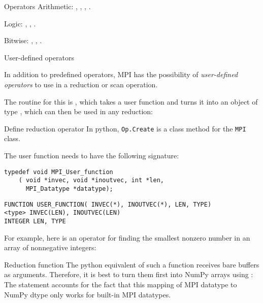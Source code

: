\begin{mplnote}{Operators}
  Arithmetic: , , , .

  Logic: , , .

  Bitwise: , , .
\end{mplnote}

 {User-defined operators}
\label{sec:mpi-op-create}

In addition to predefined operators, MPI has the possibility of
\emph{user-defined operators}
to use in a reduction or scan operation.

The routine for this is ,
which takes a user function and turns it into
an object of type , which can then be
used in any reduction:
%

\begin{pythonnote}{Define reduction operator}
  In python, \lstinline+Op.Create+ is a class method for the \lstinline+MPI+ class.
\end{pythonnote}

The user function needs to have the following signature:

\lstset{language=C}
\begin{lstlisting}
typedef void MPI_User_function
    ( void *invec, void *inoutvec, int *len, 
      MPI_Datatype *datatype); 
\end{lstlisting}

\lstset{language=Fortran}
\begin{lstlisting}
FUNCTION USER_FUNCTION( INVEC(*), INOUTVEC(*), LEN, TYPE) 
<type> INVEC(LEN), INOUTVEC(LEN) 
INTEGER LEN, TYPE 
\end{lstlisting}
\lstset{language=C}

For example, here is an operator for finding the smallest nonzero
number in an array of nonnegative integers:
%

\begin{pythonnote}{Reduction function}
  The python equivalent of such a function receives bare buffers as
  arguments. Therefore, it is best to turn them first into NumPy arrays
  using :
  The  statement accounts for the fact that this mapping of
  MPI datatype to NumPy dtype only works for built-in MPI datatypes.
\end{pythonnote}

